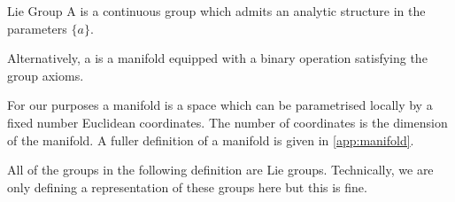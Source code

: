 \documentclass[fleqn]{NotesClass}
\begin{document}
    \begin{dfn}{Lie Group}{}
        A  is a continuous group which admits an analytic structure in the parameters \(\{a\}\).
        
        Alternatively, a  is a manifold equipped with a binary operation satisfying the group axioms.
    \end{dfn}
    For our purposes a manifold is a space which can be parametrised locally by a fixed number Euclidean coordinates.
    The number of coordinates is the dimension of the manifold.
    A fuller definition of a manifold is given in \cref{app:manifold}.

    All of the groups in the following definition are Lie groups.
    Technically, we are only defining a representation of these groups here but this is fine.
    
\end{document}
